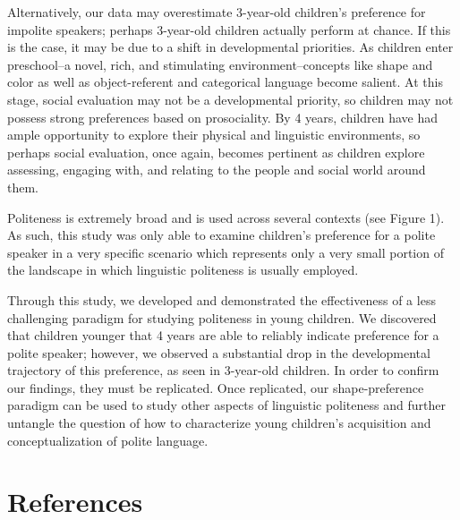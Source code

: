 \documentclass[
  english,
  man,floatsintext]{apa6}
\begin{document}
Alternatively, our data may overestimate 3-year-old children's preference for impolite speakers; perhaps 3-year-old children actually perform at chance. If this is the case, it may be due to a shift in developmental priorities. As children enter preschool--a novel, rich, and stimulating environment--concepts like shape and color as well as object-referent and categorical language become salient. At this stage, social evaluation may not be a developmental priority, so children may not possess strong preferences based on prosociality. By 4 years, children have had ample opportunity to explore their physical and linguistic environments, so perhaps social evaluation, once again, becomes pertinent as children explore assessing, engaging with, and relating to the people and social world around them.

Politeness is extremely broad and is used across several contexts (see Figure 1). As such, this study was only able to examine children's preference for a polite speaker in a very specific scenario which represents only a very small portion of the landscape in which linguistic politeness is usually employed.

Through this study, we developed and demonstrated the effectiveness of a less challenging paradigm for studying politeness in young children. We discovered that children younger that 4 years are able to reliably indicate preference for a polite speaker; however, we observed a substantial drop in the developmental trajectory of this preference, as seen in 3-year-old children. In order to confirm our findings, they must be replicated. Once replicated, our shape-preference paradigm can be used to study other aspects of linguistic politeness and further untangle the question of how to characterize young children's acquisition and conceptualization of polite language.

\newpage

\hypertarget{references}{%
\section{References}\label{references}}

\begingroup
\setlength{\parindent}{-0.5in}
\setlength{\leftskip}{0.5in}
\end{document}
